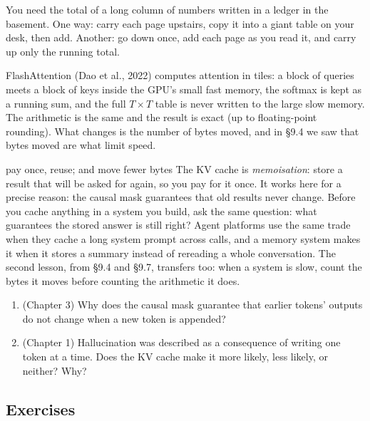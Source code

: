\Picture You need the total of a long column of numbers written in a ledger in the basement. One way: carry
each page upstairs, copy it into a giant table on your desk, then add. Another: go down once, add each page
as you read it, and carry up only the running total.

\Exactly FlashAttention (Dao et al., 2022) computes attention in tiles: a block of queries meets a block
of keys inside the GPU's small fast memory, the softmax is kept as a running sum, and the full $T\times T$
table is never written to the large slow memory. The arithmetic is the same and the result is exact (up to
floating-point rounding). What changes is the number of bytes moved, and in \S9.4 we saw that bytes moved are
what limit speed.


\begin{principle}{pay once, reuse; and move fewer bytes}
The KV cache is \emph{memoisation}: store a result that will be asked for again, so you pay for it once.
It works here for a precise reason: the causal mask guarantees that old results never change. Before you cache
anything in a system you build, ask the same question: what guarantees the stored answer is still right? Agent
platforms use the same trade when they cache a long system prompt across calls, and a memory system makes it
when it stores a summary instead of rereading a whole conversation. The second lesson, from \S9.4 and
\S9.7, transfers too: when a system is slow, count the bytes it moves before counting the arithmetic it does.
\end{principle}

\begin{lookingback}
\begin{enumerate}[label=\arabic*.,leftmargin=1.6em]
\item (Chapter 3) Why does the causal mask guarantee that earlier tokens' outputs do not change when a new
token is appended?
\item (Chapter 1) Hallucination was described as a consequence of writing one token at a time. Does the KV
cache make it more likely, less likely, or neither? Why?
\end{enumerate}
\end{lookingback}

\subsection*{Exercises}

